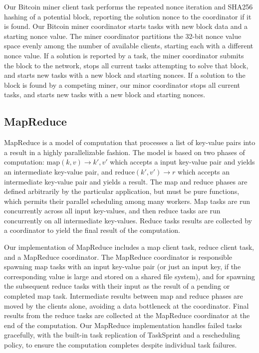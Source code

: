 \documentclass [11pt, twocolumn] {article}
\begin{document}
Our Bitcoin miner client task performs the repeated nonce iteration and SHA256 hashing of a potential block, reporting the solution nonce to the coordinator if it is found. Our Bitcoin miner coordinator starts tasks with new block data and a starting nonce value. The miner coordinator partitions the 32-bit nonce value space evenly among the number of available clients, starting each with a different nonce value. If a solution is reported by a task, the miner coordinator submits the block to the network, stops all current tasks attempting to solve that block, and starts new tasks with a new block and starting nonces. If a solution to the block is found by a competing miner, our minor coordinator stops all current tasks, and starts new tasks with a new block and starting nonces.

\subsection {MapReduce} 

MapReduce is a model of computation that processes a list of key-value pairs into a result in a highly parallelizable fashion. The model is based on two phases of computation: $\text{map}(k, v) \rightarrow k',v'$ which accepts a input key-value pair and yields an intermediate key-value pair, and $\text{reduce}(k', v') \rightarrow r$ which accepts an intermediate key-value pair and yields a result. The map and reduce phases are defined arbitrarily by the particular application, but must be pure functions, which permits their parallel scheduling among many workers. Map tasks are run concurrently across all input key-values, and then reduce tasks are run concurrently on all intermediate key-values. Reduce tasks results are collected by a coordinator to yield the final result of the computation.

Our implementation of MapReduce includes a map client task, reduce client task, and a MapReduce coordinator. The MapReduce coordinator is responsible spawning map tasks with an input key-value pair (or just an input key, if the corresponding value is large and stored on a shared file system), and for spawning the subsequent reduce tasks with their input as the result of a pending or completed map task. Intermediate results between map and reduce phases are moved by the clients alone, avoiding a data bottleneck at the coordinator. Final results from the reduce tasks are collected at the MapReduce coordinator at the end of the computation. Our MapReduce implementation handles failed tasks gracefully, with the built-in task replication of TaskSprint and a rescheduling policy, to ensure the computation completes despite individual task failures.
\end{document}

